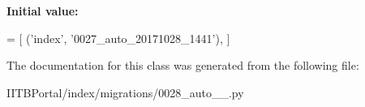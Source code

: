 {\bfseries Initial value\+:}
\begin{DoxyCode}
=  [
        (\textcolor{stringliteral}{'index'}, \textcolor{stringliteral}{'0027\_auto\_20171028\_1441'}),
    ]
\end{DoxyCode}


The documentation for this class was generated from the following file\+:\begin{DoxyCompactItemize}
\item 
I\+I\+T\+B\+Portal/index/migrations/0028\+\_\+auto\+\_\+\_.\+py\end{DoxyCompactItemize}
